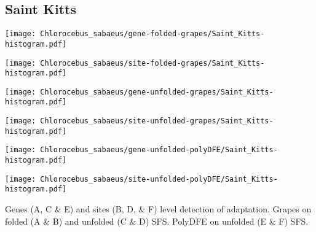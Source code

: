 \documentclass{article}
\begin{document}
\subsection{Saint Kitts}
\centering
\begin{minipage}{0.49\linewidth}
    \texttt{[image: Chlorocebus\_sabaeus/gene-folded-grapes/Saint\_Kitts-histogram.pdf]}
\end{minipage}%
\hfill
\begin{minipage}{0.49\linewidth}
    \texttt{[image: Chlorocebus\_sabaeus/site-folded-grapes/Saint\_Kitts-histogram.pdf]}
\end{minipage}
\hfill
\begin{minipage}{0.49\linewidth}
    \texttt{[image: Chlorocebus\_sabaeus/gene-unfolded-grapes/Saint\_Kitts-histogram.pdf]}
\end{minipage}%
\hfill
\begin{minipage}{0.49\linewidth}
    \texttt{[image: Chlorocebus\_sabaeus/site-unfolded-grapes/Saint\_Kitts-histogram.pdf]}
\end{minipage}
\hfill
\begin{minipage}{0.49\linewidth}
    \texttt{[image: Chlorocebus\_sabaeus/gene-unfolded-polyDFE/Saint\_Kitts-histogram.pdf]}
\end{minipage}%
\hfill
\begin{minipage}{0.49\linewidth}
    \texttt{[image: Chlorocebus\_sabaeus/site-unfolded-polyDFE/Saint\_Kitts-histogram.pdf]}
\end{minipage}
\hfill
\flushleft
Genes (A, C \& E) and sites (B, D, \& F) level detection of adaptation.
Grapes on folded (A \& B) and unfolded (C \& D) SFS.
PolyDFE on unfolded (E \& F) SFS.

\pagebreak
\end{document}
